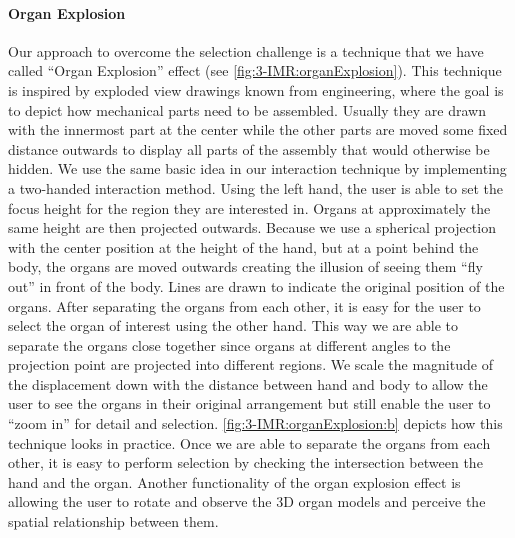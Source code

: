 \paragraph{Organ Explosion}
Our approach to overcome the selection challenge is a technique that we have called ``Organ Explosion'' effect (see \figurename{\ref{fig:3-IMR:organExplosion}}).
This technique is inspired by exploded view drawings known from engineering, where the goal is to depict how mechanical parts need to be assembled. Usually they are drawn with the innermost part at the center while the other parts are moved some fixed distance outwards to display all parts of the assembly that would otherwise be hidden.
We use the same basic idea in our interaction technique by implementing a two-handed interaction method. Using the left hand, the user is able to set the focus height for the region they are interested in. Organs at approximately the same height are then projected outwards. Because we use a spherical projection with the center position at the height of the hand, but at a point behind the body, the organs are moved outwards creating the illusion of seeing them ``fly out'' in front of the body. Lines are drawn to indicate the original position of the organs. After separating the organs from each other, it is easy for the user to select the organ of interest using the other hand.
This way we are able to separate the organs close together since organs at different angles to the projection point are projected into different regions. We scale the magnitude of the displacement down with the distance between hand and body to allow the user to see the organs in their original arrangement but still enable the user to ``zoom in'' for detail and selection. \figurename{\ref{fig:3-IMR:organExplosion:b}} depicts how this technique looks in practice.
Once we are able to separate the organs from each other, it is easy to perform selection by checking the intersection between the hand and the organ. Another functionality of the organ explosion effect is allowing the user to rotate and observe the 3D organ models and perceive the spatial relationship between them.

